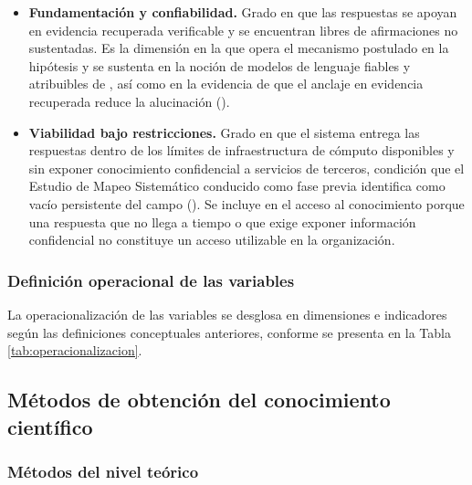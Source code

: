 \begin{itemize}
	\item \textbf{Fundamentación y confiabilidad.} Grado en que las respuestas se apoyan en evidencia recuperada verificable y se encuentran libres de afirmaciones no sustentadas. Es la dimensión en la que opera el mecanismo postulado en la hipótesis y se sustenta en la noción de modelos de lenguaje fiables y atribuibles de \textcite{Asai2024_RALMs}, así como en la evidencia de que el anclaje en evidencia recuperada reduce la alucinación (\cite{Shuster2021_Hallucination}).
	\item \textbf{Viabilidad bajo restricciones.} Grado en que el sistema entrega las respuestas dentro de los límites de infraestructura de cómputo disponibles y sin exponer conocimiento confidencial a servicios de terceros, condición que el Estudio de Mapeo Sistemático conducido como fase previa identifica como vacío persistente del campo (\cite{Alcides2026}). Se incluye en el acceso al conocimiento porque una respuesta que no llega a tiempo o que exige exponer información confidencial no constituye un acceso utilizable en la organización.
\end{itemize}


\subsubsection{Definición operacional de las variables}

La operacionalización de las variables se desglosa en dimensiones e indicadores según las definiciones conceptuales anteriores, conforme se presenta en la Tabla \ref{tab:operacionalizacion}.



\subsection{Métodos de obtención del conocimiento científico}

\subsubsection*{Métodos del nivel teórico}

